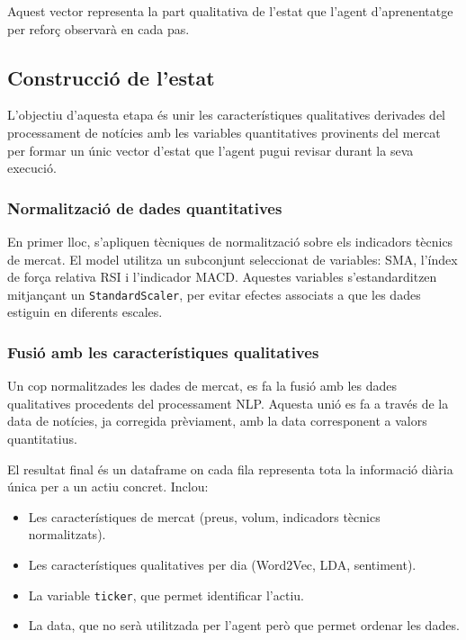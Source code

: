\documentclass[12pt,a4paper,twoside]{book}
\begin{document}
Aquest vector representa la part qualitativa de l'estat que l'agent d'aprenentatge per reforç observarà en cada pas.

\subsection{Construcció de l'estat}

L'objectiu d'aquesta etapa és unir les característiques qualitatives derivades del processament de notícies amb les variables quantitatives provinents del mercat per formar un únic vector d'estat que l'agent pugui revisar durant la seva execució.

\subsubsection{Normalització de dades quantitatives}
En primer lloc, s'apliquen tècniques de normalització sobre els indicadors tècnics de mercat. El model utilitza un subconjunt seleccionat de variables: SMA, l'índex de força relativa RSI i l'indicador MACD. Aquestes variables s'estandarditzen mitjançant un \texttt{StandardScaler}, per evitar efectes associats a que les dades estiguin en diferents escales.

\subsubsection{Fusió amb les característiques qualitatives}

Un cop normalitzades les dades de mercat, es fa la fusió amb les dades qualitatives procedents del processament NLP. Aquesta unió es fa a través de la data de notícies, ja corregida prèviament, amb la data corresponent a valors quantitatius.


El resultat final és un dataframe on cada fila representa tota la informació diària única per a un actiu concret. Inclou:
\begin{itemize}
    \item Les característiques de mercat (preus, volum, indicadors tècnics normalitzats).
    \item Les característiques qualitatives per dia (Word2Vec, LDA, sentiment).
    \item La variable \texttt{ticker}, que permet identificar l'actiu.
    \item La data, que no serà utilitzada per l'agent però que permet ordenar les dades.
\end{itemize}
\end{document}
